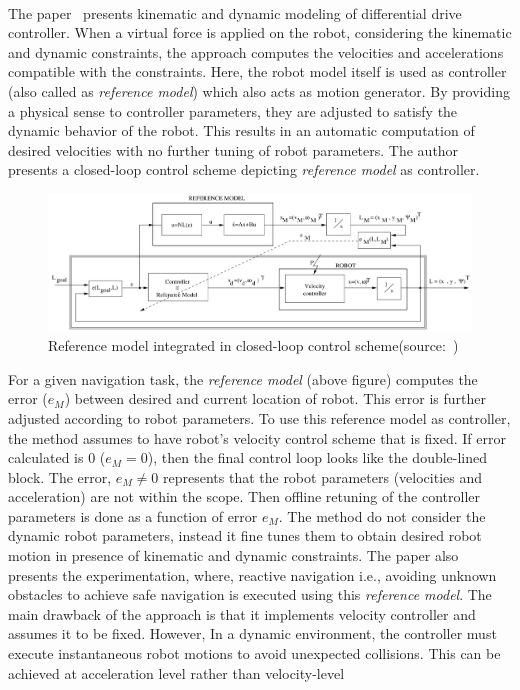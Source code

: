 \paragraph{}The paper~\cite{asensio2002kinematic} presents kinematic and dynamic modeling of differential drive controller. When a virtual force is applied on the robot, considering the kinematic and dynamic constraints, the approach computes the velocities and accelerations compatible with the constraints. Here, the robot model itself is used as controller (also called as \textit{reference model}) which also acts as motion generator. By providing a physical sense to controller parameters, they are adjusted to satisfy the dynamic behavior of the robot. This results in an automatic computation of desired velocities with no further tuning of robot parameters. The author presents a closed-loop control scheme depicting \textit{reference model} as controller.

\begin{figure}[h!]
\begin{center}
	\includegraphics[scale=0.35]{images/reference-model.png}
\end{center}
	\caption{Reference model integrated in closed-loop control scheme(source:~\cite{asensio2002kinematic})}
	\label{fig:reference-model}
\end{figure}


For a given navigation task, the \textit{reference model} (above figure) computes the error ($e_M$) between desired and current location of robot. This error is further adjusted according to robot parameters. To use this reference model as controller, the method assumes to have robot's velocity control scheme that is fixed. If error calculated is 0 ($e_M = 0$), then the final control loop looks like the double-lined block. The error, $e_M \neq 0$ represents that the robot parameters (velocities and acceleration) are not within the scope. Then offline retuning of the controller parameters is done as a function of error $e_M$. The method do not consider the dynamic robot parameters, instead it fine tunes them to obtain desired robot motion in presence of kinematic and dynamic constraints. The paper also presents the experimentation, where, reactive navigation i.e., avoiding unknown obstacles to achieve safe navigation is executed using this \textit{reference model}. The main drawback of the approach is that it implements velocity controller and assumes it to be fixed. However, {\color{red}In a dynamic environment, the controller must execute instantaneous robot motions to avoid unexpected collisions. This can be achieved at acceleration level rather than velocity-level}

